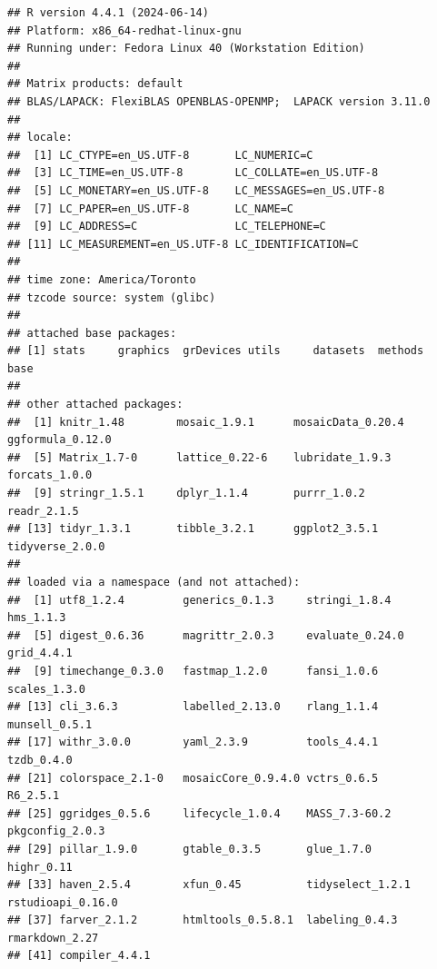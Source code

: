 \documentclass[
  10pt,
]{article}
\begin{document}
\begin{verbatim}
## R version 4.4.1 (2024-06-14)
## Platform: x86_64-redhat-linux-gnu
## Running under: Fedora Linux 40 (Workstation Edition)
## 
## Matrix products: default
## BLAS/LAPACK: FlexiBLAS OPENBLAS-OPENMP;  LAPACK version 3.11.0
## 
## locale:
##  [1] LC_CTYPE=en_US.UTF-8       LC_NUMERIC=C              
##  [3] LC_TIME=en_US.UTF-8        LC_COLLATE=en_US.UTF-8    
##  [5] LC_MONETARY=en_US.UTF-8    LC_MESSAGES=en_US.UTF-8   
##  [7] LC_PAPER=en_US.UTF-8       LC_NAME=C                 
##  [9] LC_ADDRESS=C               LC_TELEPHONE=C            
## [11] LC_MEASUREMENT=en_US.UTF-8 LC_IDENTIFICATION=C       
## 
## time zone: America/Toronto
## tzcode source: system (glibc)
## 
## attached base packages:
## [1] stats     graphics  grDevices utils     datasets  methods   base     
## 
## other attached packages:
##  [1] knitr_1.48        mosaic_1.9.1      mosaicData_0.20.4 ggformula_0.12.0 
##  [5] Matrix_1.7-0      lattice_0.22-6    lubridate_1.9.3   forcats_1.0.0    
##  [9] stringr_1.5.1     dplyr_1.1.4       purrr_1.0.2       readr_2.1.5      
## [13] tidyr_1.3.1       tibble_3.2.1      ggplot2_3.5.1     tidyverse_2.0.0  
## 
## loaded via a namespace (and not attached):
##  [1] utf8_1.2.4         generics_0.1.3     stringi_1.8.4      hms_1.1.3         
##  [5] digest_0.6.36      magrittr_2.0.3     evaluate_0.24.0    grid_4.4.1        
##  [9] timechange_0.3.0   fastmap_1.2.0      fansi_1.0.6        scales_1.3.0      
## [13] cli_3.6.3          labelled_2.13.0    rlang_1.1.4        munsell_0.5.1     
## [17] withr_3.0.0        yaml_2.3.9         tools_4.4.1        tzdb_0.4.0        
## [21] colorspace_2.1-0   mosaicCore_0.9.4.0 vctrs_0.6.5        R6_2.5.1          
## [25] ggridges_0.5.6     lifecycle_1.0.4    MASS_7.3-60.2      pkgconfig_2.0.3   
## [29] pillar_1.9.0       gtable_0.3.5       glue_1.7.0         highr_0.11        
## [33] haven_2.5.4        xfun_0.45          tidyselect_1.2.1   rstudioapi_0.16.0 
## [37] farver_2.1.2       htmltools_0.5.8.1  labeling_0.4.3     rmarkdown_2.27    
## [41] compiler_4.4.1
\end{verbatim}
\end{document}
